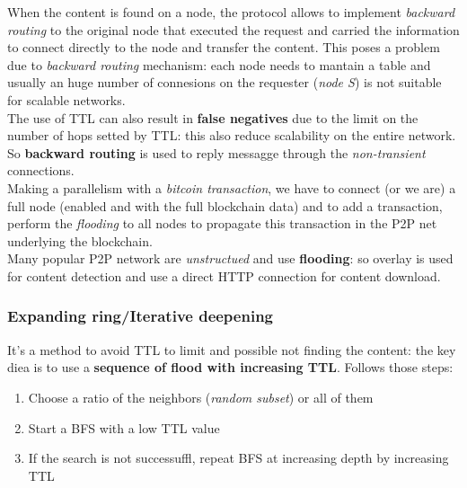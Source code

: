 \documentclass[10pt,a4paper]{report}
\begin{document}
When the content is found on a node, the protocol allows to implement \textit{backward routing} to the original node that executed the request and carried the information to connect directly to the node and transfer the content. This poses a problem due to \textit{backward routing} mechanism: each node needs to mantain a table and usually an huge number of connesions on the requester (\textit{node S}) is not suitable for scalable networks.\\
The use of TTL can also result in \textbf{false negatives} due to the limit on the number of hops setted by TTL: this also reduce scalability on the entire network.
So \textbf{backward routing} is used to reply messagge through the \textit{non-transient} connections.
\\
Making a parallelism with a \textit{bitcoin transaction}, we have to connect (or we are) a full node (enabled and with the full blockchain data) and to add a transaction, perform the \textit{flooding} to all nodes to propagate this transaction in the P2P net underlying the blockchain.\\
Many popular P2P network are \textit{unstructued} and use \textbf{flooding}: so overlay is used for content detection and use a direct HTTP connection for content download.
\subsubsection{Expanding ring/Iterative deepening}\label{sec:expanding-ringiterative-deepening}
It's a method to avoid TTL to limit and possible not finding the content: the key diea is to use a \textbf{sequence of flood with increasing TTL}. Follows those steps:
\begin{enumerate}
	\item 
	Choose a ratio of the neighbors (\textit{random subset}) or all of them
	\item 
	Start a BFS with a low TTL value
	\item 
	If the search is not successuffl, repeat BFS at increasing depth by increasing TTL
	
\end{enumerate}
\end{document}
